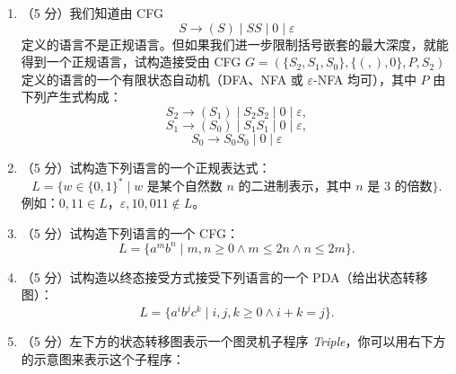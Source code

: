 \documentclass[UTF8,zihao=5]{ctexart}
\begin{document}
\begin{enumerate}[start=22]
  \item （5 分）我们知道由 CFG
  \[
    S\to (S)\mid SS\mid 0\mid \varepsilon
  \]
  定义的语言不是正规语言。但如果我们进一步限制括号嵌套的最大深度，就能得到一个正规语言，试构造接受由 CFG
  $G=(\{S_2,S_1,S_0\},\{(,),0\},P,S_2)$ 定义的语言的一个有限状态自动机（DFA、NFA 或 $\varepsilon$-NFA 均可），其中 $P$ 由下列产生式构成：
  \[
    S_2\to (S_1)\mid S_2S_2\mid 0\mid \varepsilon,
  \]
  \[
    S_1\to (S_0)\mid S_1S_1\mid 0\mid \varepsilon,
  \]
  \[
    S_0\to S_0S_0\mid 0\mid \varepsilon
  \]

  \item （5 分）试构造下列语言的一个正规表达式：
  \[
    L=\{w\in\{0,1\}^*\mid w\text{ 是某个自然数 }n\text{ 的二进制表示，其中 }n\text{ 是 }3\text{ 的倍数}\}.
  \]
  例如：$0,11\in L$，$\varepsilon,10,011\notin L$。

  \item （5 分）试构造下列语言的一个 CFG：
  \[
    L=\{a^m b^n\mid m,n\ge 0\land m\le 2n\land n\le 2m\}.
  \]

  \item （5 分）试构造以终态接受方式接受下列语言的一个 PDA（给出状态转移图）：
  \[
    L=\{a^i b^j c^k\mid i,j,k\ge 0\land i+k=j\}.
  \]

  \item （5 分）左下方的状态转移图表示一个图灵机子程序 \textit{Triple}，你可以用右下方的示意图来表示这个子程序：
  \begin{center}
  \begin{minipage}[c]{0.64\linewidth}
  \centering
\end{minipage}
\end{center}
\end{enumerate}
\end{document}
